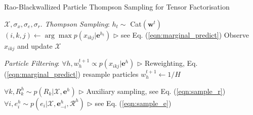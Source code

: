 \documentclass{article}
\begin{document}
\begin{algorithm}[t!]
   \caption{Rao-Blackwallized Particle Thompson Sampling for Tensor Factorisation}
   \label{alg:rbsmc}
\begin{algorithmic}
    $\mathcal{X}, \sigma_x, \sigma_e, \sigma_r$.
   \STATE \textit{Thompson Sampling}:
   \STATE $h_t \sim $ Cat$(\mathbf{w}^{t})$
   \STATE $(i,k,j) \leftarrow \arg\max p(x_{ikj}| \mathbf{e}^{h_t})$    \hfill $\triangleright$ see Eq. (\ref{eqn:marginal_predict})
   \STATE Observe $x_{ikj}$ and update $\mathcal{X}$
   
   \STATE \textit{Particle Filtering}:   
   \STATE $\forall h, w_h^{t+1} \propto p(x_{ikj} | \mathbf{e}^{h})$   \hfill $\triangleright$ Reweighting, Eq. (\ref{eqn:marginal_predict})
   \STATE resample particles
   \STATE $w_h^{t+1} \leftarrow 1/H$
   \ENDIF

   \STATE $\forall k, R_k^{h} \sim p(R_k | \mathcal{X}, \mathbf{e}^{h})$   \hfill $\triangleright$ Auxiliary sampling, see Eq. (\ref{eqn:sample_r})
   \STATE $\forall i, e^{h}_i \sim p(e_i | \mathcal{X}, \mathbf{e}^{h}_{-i}, \mathcal{R}^{h})$ \hfill $\triangleright$ see Eq. (\ref{eqn:sample_e})
   \ENDFOR
   
   \ENDFOR
\end{algorithmic}
\end{algorithm}


\nocite{*}



\end{document}
